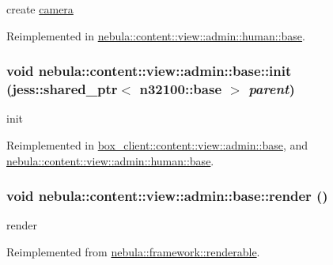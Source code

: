 create \hyperlink{classnebula_1_1content_1_1camera}{camera} 

Reimplemented in \hyperlink{classnebula_1_1content_1_1view_1_1admin_1_1human_1_1base_a3cfdc93ec0d6d15b65cbd82f4c49e61f}{nebula::content::view::admin::human::base}.\hypertarget{classnebula_1_1content_1_1view_1_1admin_1_1base_a8226e4b40dd4752b5b88f868ac6185ca}{
\subsubsection[{init}]{\setlength{\rightskip}{0pt plus 5cm}void nebula::content::view::admin::base::init (jess::shared\_\-ptr$<$ {\bf n32100::base} $>$ {\em parent})}}
\label{classnebula_1_1content_1_1view_1_1admin_1_1base_a8226e4b40dd4752b5b88f868ac6185ca}


init 

Reimplemented in \hyperlink{classbox__client_1_1content_1_1view_1_1admin_1_1base_af88601d48e2691df5b15427b3cccb7a9}{box\_\-client::content::view::admin::base}, and \hyperlink{classnebula_1_1content_1_1view_1_1admin_1_1human_1_1base_ac03c971a7f2769dfce37c70b97539768}{nebula::content::view::admin::human::base}.\hypertarget{classnebula_1_1content_1_1view_1_1admin_1_1base_a9bd1285f26e75372fd8c3cf1da848f29}{
\subsubsection[{render}]{\setlength{\rightskip}{0pt plus 5cm}void nebula::content::view::admin::base::render ()}}
\label{classnebula_1_1content_1_1view_1_1admin_1_1base_a9bd1285f26e75372fd8c3cf1da848f29}


render 

Reimplemented from \hyperlink{classnebula_1_1framework_1_1renderable_a97ba14a1d360e248ce8a82a3d2b7e15d}{nebula::framework::renderable}.

